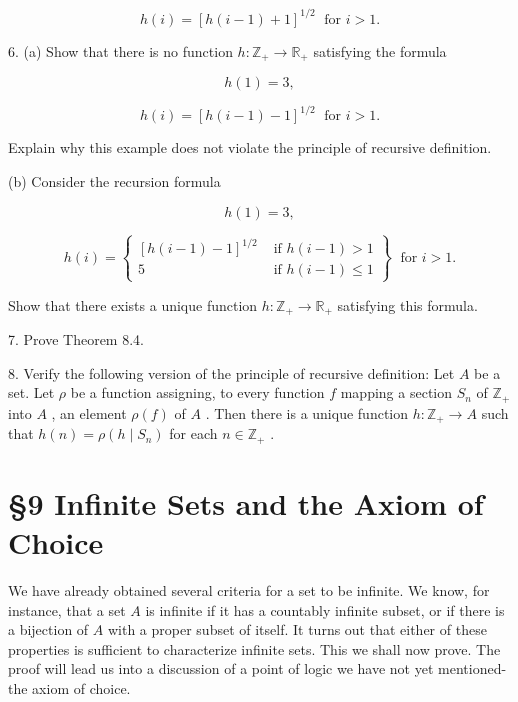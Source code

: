 \[
h\left( i\right)  = {\left\lbrack  h\left( i - 1\right)  + 1\right\rbrack  }^{1/2}\;\text{ for }i > 1.
\]

6. (a) Show that there is no function \(h : {\mathbb{Z}}_{ + } \rightarrow  {\mathbb{R}}_{ + }\) satisfying the formula

\[
h\left( 1\right)  = 3,
\]

\[
h\left( i\right)  = {\left\lbrack  h\left( i - 1\right)  - 1\right\rbrack  }^{1/2}\;\text{ for }i > 1.
\]

Explain why this example does not violate the principle of recursive definition.

(b) Consider the recursion formula

\[
h\left( 1\right)  = 3,
\]

\[
h\left( i\right)  = \left\{  \begin{array}{ll} {\left\lbrack  h\left( i - 1\right)  - 1\right\rbrack  }^{1/2} & \text{ if }h\left( {i - 1}\right)  > 1 \\  5 & \text{ if }h\left( {i - 1}\right)  \leq  1 \end{array}\right\}  \;\text{ for }i > 1.
\]

Show that there exists a unique function \(h : {\mathbb{Z}}_{ + } \rightarrow  {\mathbb{R}}_{ + }\) satisfying this formula.

7. Prove Theorem 8.4.

8. Verify the following version of the principle of recursive definition: Let \(A\) be a set. Let \(\rho\) be a function assigning, to every function \(f\) mapping a section \({S}_{n}\) of \({\mathbb{Z}}_{ + }\) into \(A\) , an element \(\rho \left( f\right)\) of \(A\) . Then there is a unique function \(h : {\mathbb{Z}}_{ + } \rightarrow  A\) such that \(h\left( n\right)  = \rho \left( {h \mid  {S}_{n}}\right)\) for each \(n \in  {\mathbb{Z}}_{ + }\) .

\section*{§9 Infinite Sets and the Axiom of Choice}

We have already obtained several criteria for a set to be infinite. We know, for instance, that a set \(A\) is infinite if it has a countably infinite subset, or if there is a bijection of \(A\) with a proper subset of itself. It turns out that either of these properties is sufficient to characterize infinite sets. This we shall now prove. The proof will lead us into a discussion of a point of logic we have not yet mentioned-the axiom of choice.

